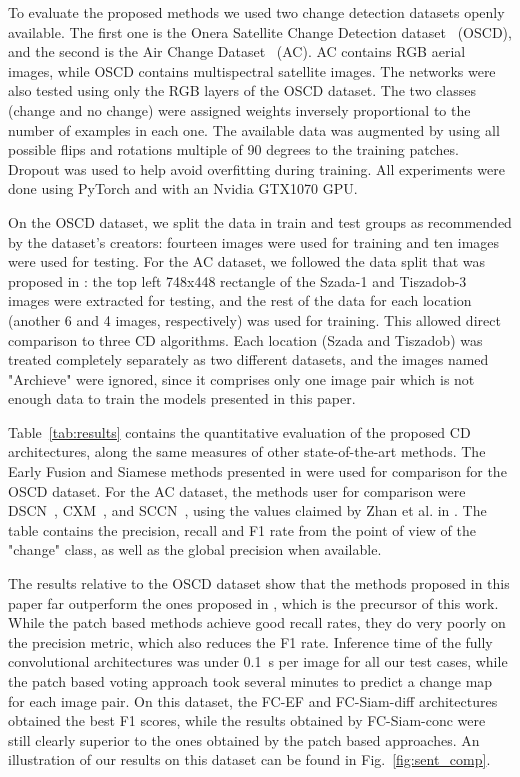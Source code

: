 \documentclass{article}
\begin{document}
To evaluate the proposed methods we used two change detection datasets openly available. The first one is the Onera Satellite Change Detection dataset~\cite{daudt2018urban} (OSCD), and the second is the Air Change Dataset~\cite{benedek2009change} (AC). AC contains RGB aerial images, while OSCD contains multispectral satellite images. The networks were also tested using only the RGB layers of the OSCD dataset. The two classes (change and no change) were assigned weights inversely proportional to the number of examples in each one. The available data was augmented by using all possible flips and rotations multiple of 90 degrees to the training patches. Dropout was used to help avoid overfitting during training. 
All experiments were done using PyTorch and with an Nvidia GTX1070 GPU.




On the OSCD dataset, we split the data in train and test groups as recommended by the dataset's creators: fourteen images were used for training and ten images were used for testing. For the AC dataset, we followed the data split that was proposed in \cite{zhan2017change}: the top left 748x448 rectangle of the Szada-1 and Tiszadob-3 images were extracted for testing, and the rest of the data for each location (another 6 and 4 images, respectively) was used for training. This allowed direct comparison to three CD algorithms. Each location (Szada and Tiszadob) was treated completely separately as two different datasets, and the images named "Archieve" were ignored, since it comprises only one image pair which is not enough data to train the models presented in this paper.


Table~\ref{tab:results} contains the quantitative evaluation of the proposed CD architectures, along the same measures of other state-of-the-art methods. The Early Fusion and Siamese methods presented in \cite{daudt2018urban} were used for comparison for the OSCD dataset. For the AC dataset, the methods user for comparison were DSCN~\cite{zhan2017change}, CXM~\cite{benedek2009change}, and SCCN~\cite{liu2016deep}, using the values claimed by Zhan et al. in \cite{zhan2017change}. The table contains the precision, recall and F1 rate from the point of view of the "change" class, as well as the global precision when available.

The results relative to the OSCD dataset show that the methods proposed in this paper far outperform the ones proposed in \cite{daudt2018urban}, which is the precursor of this work. While the patch based methods achieve good recall rates, they do very poorly on the precision metric, which also reduces the F1 rate. Inference time of the fully convolutional architectures was under 0.1~s per image for all our test cases, while the patch based voting approach took several minutes to predict a change map for each image pair. On this dataset, the FC-EF and FC-Siam-diff architectures obtained the best F1 scores, while the results obtained by FC-Siam-conc were still clearly superior to the ones obtained by the patch based approaches. An illustration of our results on this dataset can be found in Fig.~\ref{fig:sent_comp}.
\end{document}
